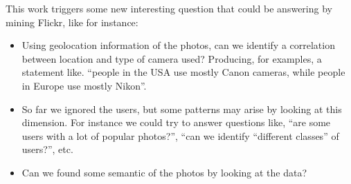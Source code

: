 \documentclass[letter,12pt]{article}
\begin{document}
This work triggers some new interesting question that could be answering by mining Flickr, like for instance:
\begin{itemize}
\item Using geolocation information of the photos, can we identify a correlation between location and type of camera used? Producing, for examples, a statement like. ``people in the USA use mostly Canon cameras, while people in Europe use mostly Nikon''.
\item So far we ignored the users, but some patterns may arise by looking at this dimension. For instance we could try to answer questions like, ``are some users with a lot of popular photos?'', ``can we identify ``different classes'' of users?'', etc.
\item Can we found some semantic of the photos by looking at the data?
\end{itemize}



\end{document}
